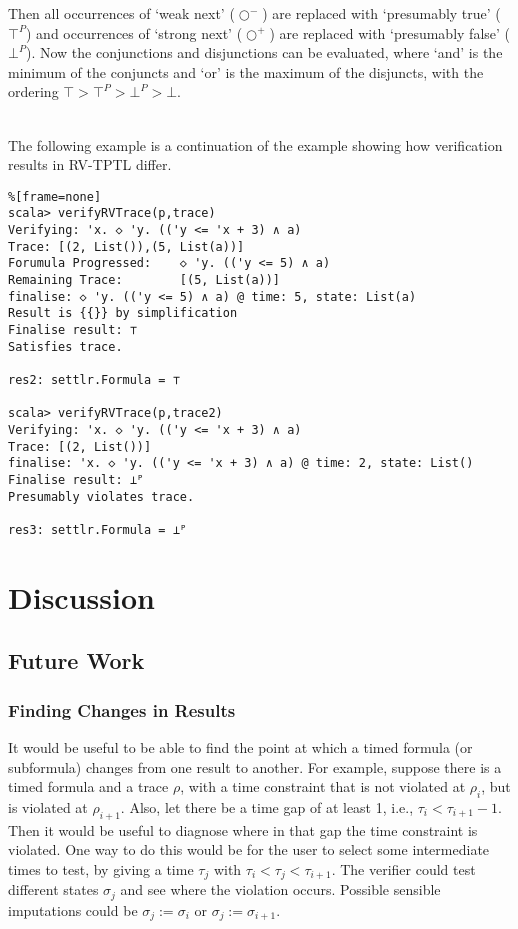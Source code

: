 \documentclass[a4paper]{article}
\newcommand{\sn}{\bigcirc^+}
\newcommand{\wn}{\bigcirc^-}
\begin{document}
Then all occurrences of `weak next' ($\wn$) are replaced with `presumably true' ($\top^P$) and occurrences of `strong next' ($\sn$) are replaced with `presumably false' ($\bot^P$). Now the conjunctions and disjunctions can be evaluated, where `and' is the minimum of the conjuncts and `or' is the maximum of the disjuncts, with the ordering $\top>\top^P>\bot^P>\bot$.

\begin{eg}~\\
  The following example is a continuation of the  example showing how verification results in RV-TPTL differ.
\begin{lstlisting}%[frame=none]
scala> verifyRVTrace(p,trace)
Verifying: 'x. ◇ 'y. (('y <= 'x + 3) ∧ a)
Trace: [(2, List()),(5, List(a))]
Forumula Progressed:    ◇ 'y. (('y <= 5) ∧ a)
Remaining Trace:        [(5, List(a))]
finalise: ◇ 'y. (('y <= 5) ∧ a) @ time: 5, state: List(a)
Result is {{}} by simplification
Finalise result: ⊤
Satisfies trace.

res2: settlr.Formula = ⊤

scala> verifyRVTrace(p,trace2)
Verifying: 'x. ◇ 'y. (('y <= 'x + 3) ∧ a)
Trace: [(2, List())]
finalise: 'x. ◇ 'y. (('y <= 'x + 3) ∧ a) @ time: 2, state: List()
Finalise result: ⊥ᴾ
Presumably violates trace.

res3: settlr.Formula = ⊥ᴾ
\end{lstlisting}
\end{eg}

\section{Discussion}
\subsection{Future Work}

\subsubsection{Finding Changes in Results}
It would be useful to be able to find the point at which a timed formula (or subformula) changes from one result to another. For example, suppose there is a timed formula and a trace $\rho$, with a time constraint that is not violated at $\rho_i$, but is violated at $\rho_{i+1}$. Also, let there be a time gap of at least 1, i.e., $\tau_i < \tau_{i+1} - 1$. Then it would be useful to diagnose where in that gap the time constraint is violated. One way to do this would be for the user to select some intermediate times to test, by giving a time $\tau_j$ with $\tau_i < \tau_j < \tau_{i+1}$. The verifier could test different states $\sigma_j$ and see where the violation occurs. Possible sensible imputations could be $\sigma_j := \sigma_i$ or $\sigma_j := \sigma_{i+1}$.
\end{document}
